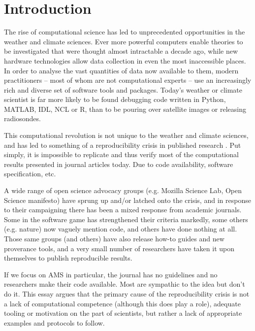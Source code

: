 \section{Introduction}
The rise of computational science has led to unprecedented opportunities in the weather and climate sciences. Ever more powerful computers enable theories to be investigated that were thought almost intractable a decade ago, while new hardware technologies allow data collection in even the most inaccessible places. In order to analyse the vast quantities of data now available to them, modern practitioners – most of whom are not computational experts – use an increasingly rich and diverse set of software tools and packages. Today's weather or climate scientist is far more likely to be found debugging code written in Python, MATLAB, IDL, NCL or R, than to be pouring over satellite images or releasing radiosondes. 

This computational revolution is not unique to the weather and climate sciences, and has led to something of a reproducibility crisis in published research \citep[e.g.][]{Peng2011}. Put simply, it is impossible to replicate and thus verify most of the computational results presented in journal articles today. Due to code availability, software specification, etc.

A wide range of open science advocacy groups (e.g. Mozilla Science Lab, Open Science manifesto) have sprung up and/or latched onto the crisis, and in response to their campaigning there has been a mixed response from academic journals. Some in the software game has strengthened their criteria markedly, some others (e.g. nature) now vaguely mention code, and others have done nothing at all. Those same groups (and others) have also release how-to guides and new proverance tools, and a very small number of researchers have taken it upon themselves to publish reproducible results. 

If we focus on AMS in particular, the journal has no guidelines and no researchers make their code available. Most are sympathic to the idea but don't do it. This essay argues that the primary cause of the reproducibility crisis is not a lack of computational competence (although this does play a role), adequate tooling or motivation on the part of scientists, but rather a lack of appropriate examples and protocols to follow.
